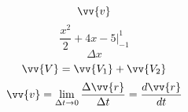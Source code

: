\documentclass[12pt,a4paper,english]{article}
\begin{document}
\begin{flushleft}
    \[ \vv{v} \]
\[ \frac{x^2}{2}+4x-5\Biggr\rvert_{-1}^1 \]
\[ \Delta x \]
\[\vv{V}=\vv{V_{1}}+\vv{V_{2}}\]
\[
    \vv{v} = \lim_{\Delta t \to 0} \frac{\Delta \vv{r}}{\Delta t}
    =\frac{d\vv{r}}{dt}
\]
\end{flushleft}
\end{document}

